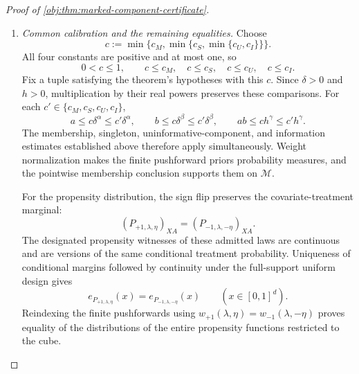 \begin{proof}[Proof of \cref{obj:thm:marked-component-certificate}]
\begin{enumerate}
For two densities against a common dominating measure, substitution into \cref{obj:def:hellinger} gives the integral of their squared square-root difference. Applying this identity and then integrating over covariates yields
\[
H^2(M_{+1},M_{-1})
=
\int
\left[
\int(\sqrt{g_{+1}(\mathbf x,\mathbf s)}
-\sqrt{g_{-1}(\mathbf x,\mathbf s)})^2
\,d\mu_{\mathrm{spin}}(\mathbf s)
\right]d\nu_{\mathrm{cov}}(\mathbf x).
\]
The finite graph counts are measurable, and all functions in the finite weighted count sum are integrable. Integrating the conditional bound therefore gives
\[
H^2(M_{+1},M_{-1})
\le
K_{\mathrm{info}}a^2b^2
\sum_{p_{\mathrm{cmp}}=2}^{N}
(9/2)^{p_{\mathrm{cmp}}}p_{\mathrm{cmp}}^4
\int C_{p_{\mathrm{cmp}}}^{\mathrm L}\,d\nu_{\mathrm{cov}}.
\]
Every term is nonnegative, so extending the size sum to the shifted range used above gives
\[
\begin{aligned}
H^2(M_{+1},M_{-1})
&\le
K_{\mathrm{info}}a^2b^2
\sum_{j=0}^{N-1}
(9/2)^{j+2}(j+2)^4
\int C_{j+2}^{\mathrm L}\,d\nu_{\mathrm{cov}}\\
&\le
K_{\mathrm{info}}C_{\mathrm{tree}}
nNh^d\delta^da^2b^2.
\end{aligned}
\]
Define
\[
C:=K_{\mathrm{info}}C_{\mathrm{tree}}>0.
\]
This proves the required information estimate under the amplitude conditions with \(c_I\) and the occupancy condition with \(c_0\).

\item \textit{Common calibration and the remaining equalities.}
Choose
\[
c:=\min\{c_M,\min\{c_S,\min\{c_U,c_I\}\}\}.
\]
All four constants are positive and at most one, so
\[
0<c\le1,
\qquad
c\le c_M,\quad c\le c_S,\quad c\le c_U,\quad c\le c_I.
\]
Fix a tuple satisfying the theorem's hypotheses with this \(c\). Since \(\delta>0\) and \(h>0\), multiplication by their real powers preserves these comparisons. For each
\(c'\in\{c_M,c_S,c_U,c_I\}\),
\[
a\le c\delta^\alpha\le c'\delta^\alpha,\qquad
b\le c\delta^\beta\le c'\delta^\beta,\qquad
ab\le ch^\gamma\le c'h^\gamma.
\]
The membership, singleton, uninformative-component, and information estimates established above therefore apply simultaneously. Weight normalization makes the finite pushforward priors probability measures, and the pointwise membership conclusion supports them on \(\mathcal M\).

For the propensity distribution, the sign flip preserves the covariate-treatment marginal:
\[
(P_{+1,\lambda,\eta})_{XA}
=
(P_{-1,\lambda,-\eta})_{XA}.
\]
The designated propensity witnesses of these admitted laws are continuous and are versions of the same conditional treatment probability. Uniqueness of conditional margins followed by continuity under the full-support uniform design gives
\[
e_{P_{+1,\lambda,\eta}}(x)
=
e_{P_{-1,\lambda,-\eta}}(x)
\qquad(x\in[0,1]^d).
\]
Reindexing the finite pushforwards using
\(w_{+1}(\lambda,\eta)=w_{-1}(\lambda,-\eta)\) proves equality of the distributions of the entire propensity functions restricted to the cube.


\end{enumerate}
\end{proof}
